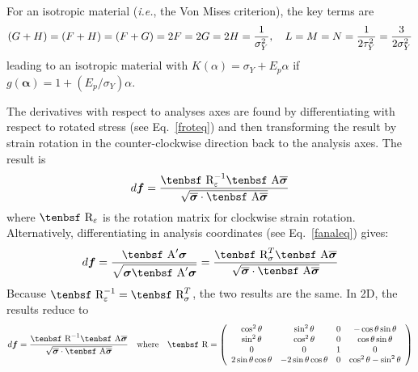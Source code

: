 \documentclass[11pt]{article}
\renewcommand{\vec}[1]{\boldsymbol{#1}}
\def\A{\hbox{\tenbsf A}}
\def\df{d \vec{f}}
\def\R{\hbox{\tenbsf R}}
\begin{document}
For an isotropic material ({\em i.e.}, the Von Mises criterion), the key terms are
\begin{equation}
   (G+H) = (F+H) = (F+G) = 2F = 2G = 2H = {1\over \sigma_Y^2}, \quad L=M=N = {1\over 2\tau_Y^2} = {3\over 2\sigma_Y^2}
\end{equation}
leading to an isotropic material with $K(\alpha)=\sigma_Y + E_p\alpha$ if $g(\vec\alpha) = 1 + (E_p/\sigma_Y)\alpha$.

The derivatives with respect to analyses axes are found by differentiating with respect to rotated stress (see Eq.~\ref{froteq}) and then transforming the result by strain rotation in the counter-clockwise direction back to the analysis axes. The result is
\begin{equation}
         \df = {\R_\varepsilon^{-1}\A \overline{\vec\sigma}\over\sqrt{\overline{\vec\sigma} \cdot \A \overline{\vec\sigma}}} \end{equation}
where $\R_\varepsilon$ is the rotation matrix for clockwise strain rotation. Alternatively, differentiating in analysis coordinates (see Eq.~\ref{fanaleq}) gives:
\begin{equation}
   \df = {\A' \vec\sigma\over\sqrt{\vec\sigma \A' \vec\sigma}}  = {\R_\sigma^T\A \overline{\vec\sigma}\over\sqrt{\overline{\vec\sigma} \cdot \A \overline{\vec\sigma}}} 
\end{equation}
Because $\R_\varepsilon^{-1} = \R_\sigma^T$, the two results are the same. In 2D, the results reduce to
\begin{equation}
         \df = {\R^{-1}\A \overline{\vec\sigma}\over\sqrt{\overline{\vec\sigma} \cdot \A \overline{\vec\sigma}}}    \quad{\rm where}\quad
         \R = \left( \begin{array}{cccc}
                       \cos^2\theta & \sin^2\theta & 0 & -\cos\theta\sin\theta \\
                       \sin^2\theta & \cos^2\theta & 0 & \cos\theta\sin\theta \\
                       0 & 0 & 1 & 0 \\
                       2\sin\theta\cos\theta & -2\sin\theta\cos\theta & 0 & \cos^2\theta - \sin^2\theta
                       \end{array} \right)
\end{equation}
\end{document}
